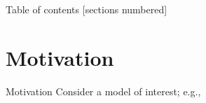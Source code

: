 \documentclass[10pt]{beamer}
\newcommand{\x}{X}
\newcommand{\y}{Y}
\begin{document}
\maketitle

\begin{frame}{Table of contents}
  [sections numbered]
  \tableofcontents[hideallsubsections]
\end{frame}

\section{Motivation}
\begin{frame}{Motivation}
Consider a model of interest; e.g.,


\end{frame}
\end{document}
